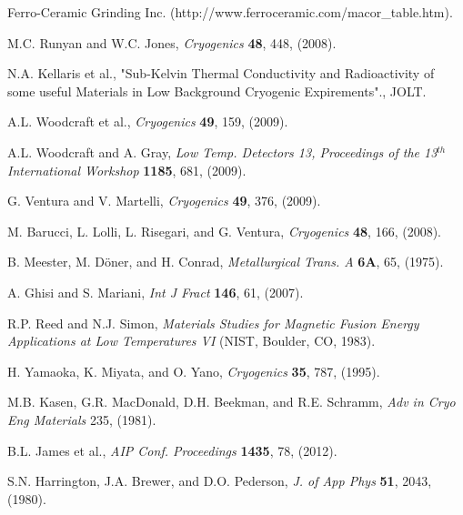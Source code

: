 \documentclass[final]{svjour2}
\begin{document}
\begin{thebibliography}{99}
Ferro-Ceramic Grinding Inc. (http://www.ferroceramic.com/macor\_table.htm).


M.C. Runyan and W.C. Jones, {\it Cryogenics} \textbf{48}, 448, (2008).

N.A. Kellaris et al., "Sub-Kelvin Thermal Conductivity and Radioactivity of some useful Materials in Low Background Cryogenic Expirements"., JOLT.

A.L. Woodcraft et al., {\it Cryogenics} \textbf{49}, 159, (2009).

A.L. Woodcraft and A. Gray, {\it Low Temp. Detectors 13, Proceedings of the 13$^{th}$ International Workshop} \textbf{1185}, 681, (2009).

G. Ventura and V. Martelli, {\it Cryogenics} \textbf{49}, 376, (2009).

M. Barucci, L. Lolli, L. Risegari, and G. Ventura, {\it Cryogenics} \textbf{48}, 166, (2008).

B. Meester, M. D\"{o}ner, and H. Conrad, {\it Metallurgical Trans. A} \textbf{6A}, 65, (1975).

A. Ghisi and S. Mariani, {\it Int J Fract} \textbf{146}, 61, (2007).

R.P. Reed and N.J. Simon, {\it Materials Studies for Magnetic Fusion Energy Applications at Low Temperatures VI} (NIST, Boulder, CO, 1983).

H. Yamaoka, K. Miyata, and O. Yano, {\it Cryogenics} \textbf{35}, 787, (1995).

M.B. Kasen, G.R. MacDonald, D.H. Beekman, and R.E. Schramm, {\it Adv in Cryo Eng Materials} 235, (1981).

B.L. James et al., {\it AIP Conf. Proceedings} \textbf{1435}, 78, (2012).

S.N. Harrington, J.A. Brewer, and D.O. Pederson, {\it J. of App Phys} \textbf{51}, 2043, (1980).

\end{thebibliography}
\end{document}
